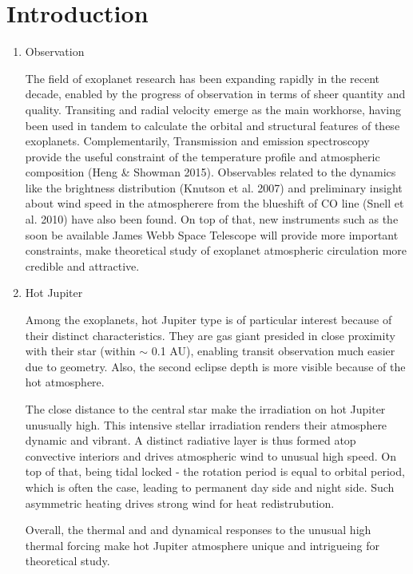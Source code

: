 \documentclass[11pt]{article}
\begin{document}
\section{Introduction}

\begin{enumerate}

\item Observation 

The field of exoplanet research has been expanding rapidly in the recent decade, enabled by the progress of observation in terms of sheer quantity and quality. Transiting and radial velocity emerge as the main workhorse, having been used in tandem to calculate the orbital and structural features of these exoplanets. Complementarily, Transmission and emission spectroscopy provide the useful constraint of the temperature profile and atmospheric composition (Heng \& Showman 2015). Observables related to the dynamics like the brightness distribution (Knutson et al. 2007) and preliminary insight about wind speed in the atmospherere from the blueshift of CO line (Snell et al. 2010) have also been found. On top of that, new instruments such as the soon be available James Webb Space Telescope will provide more important constraints, make theoretical study of exoplanet atmospheric circulation more credible and attractive. 

\item Hot Jupiter

Among the exoplanets, hot Jupiter type is of particular interest because of their distinct characteristics. They are gas giant presided in close proximity with their star (within $\sim$ 0.1 AU), enabling transit observation much easier due to geometry. Also, the second eclipse depth is more visible because of the hot atmosphere. 

The close distance to the central star make the irradiation on hot Jupiter unusually high. This intensive stellar irradiation renders their atmosphere dynamic and vibrant. A distinct radiative layer is thus formed atop convective interiors and drives atmospheric wind to unusual high speed. On top of that, being tidal locked - the rotation period is equal to orbital period, which is often the case, leading to permanent day side and night side. Such asymmetric heating drives strong wind for heat redistrubution. 

Overall, the thermal and and dynamical responses to the unusual high thermal forcing make hot Jupiter atmosphere unique and intrigueing for theoretical study.


\end{enumerate}
\end{document}
